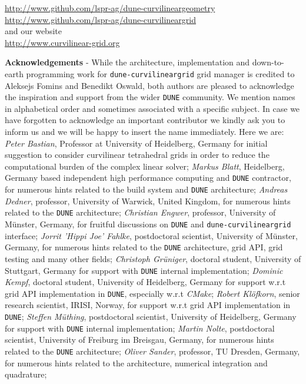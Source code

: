 \documentclass[a4paper,11pt]{article}
\newcommand{\dune}{\setlength\emergencystretch{3cm}\texttt{DUNE}}
\newcommand{\curvgrid}{\setlength\emergencystretch{3cm}\texttt{dune-curvilineargrid}}
\begin{document}
\noindent
\url{http://www.github.com/lspr-ag/dune-curvilineargeometry}\\
\url{http://www.github.com/lspr-ag/dune-curvilineargrid}\\

\noindent
and our website\\

\noindent
\url{http://www.curvilinear-grid.org}







\pagebreak
\vspace{15mm}
\noindent \textbf{Acknowledgements} - While the architecture, implementation and down-to-earth programming work for \curvgrid{} grid manager is credited to Aleksejs Fomins and Benedikt Oswald, both authors are pleased to acknowledge the inspiration and support from the wider \dune{} community. We mention names in alphabetical order and sometimes associated with a specific subject. In case we have forgotten to acknowledge an important contributor we kindly ask you to inform us and we will be happy to insert the name immediately. Here we are:
\textit{Peter Bastian}, Professor at University of Heidelberg, Germany for initial suggestion to consider curvilinear tetrahedral grids in order to reduce the computational burden of the complex linear solver;
\textit{Markus Blatt}, Heidelberg, Germany based independent high performance computing and \dune{} contractor, for numerous hints related to the build system and \dune{} architecture;
\textit{Andreas Dedner}, professor, University of Warwick, United Kingdom, for numerous hints related to the \dune{} architecture;
\textit{Christian Engwer}, professor, University of M\"unster, Germany, for fruitful discussions on \dune{} and \curvgrid{} interface;
\textit{Jorrit 'Hippi Joe' Fahlke}, postdoctoral scientist, University of M\"unster, Germany, for numerous hints related to the \dune{} architecture, grid API, grid testing and many other fields;
\textit{Christoph Gr\"uniger}, doctoral student, University of Stuttgart, Germany for support with \dune{} internal implementation;
\textit{Dominic Kempf}, doctoral student, University of Heidelberg, Germany for support w.r.t grid API implementation in \dune{}, especially w.r.t \textit{CMake};
\textit{Robert Kl\"ofkorn}, senior research scientist, IRISI, Norway, for support w.r.t grid API implementation in \dune{};
\textit{Steffen M\"uthing}, postdoctoral scientist, University of Heidelberg, Germany for support with \dune{} internal implementation;
\textit{Martin Nolte}, postdoctoral scientist, University of Freiburg im Breisgau, Germany, for numerous hints related to the \dune{} architecture;
\textit{Oliver Sander}, professor, TU Dresden, Germany, for numerous hints related to the  architecture, numerical integration and quadrature; \\
\end{document}
